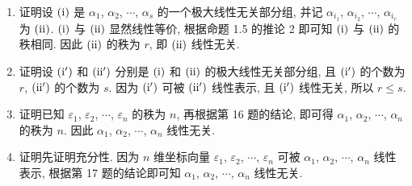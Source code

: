\documentclass[a4paper, 11pt]{ctexart}
\begin{document}
\begin{enumerate}
        \item %
            {\heiti 证明}\quad 设 $(\mathrm{\uppercase\expandafter{\romannumeral1}})$ 是 $\alpha_1$, $\alpha_2$, $\cdots$, $\alpha_s$ 的一个极大线性无关部分组, 并记 $\alpha_{i_1}$, $\alpha_{i_2}$, $\cdots$, $\alpha_{i_r}$ 为 $(\mathrm{\uppercase\expandafter{\romannumeral2}})$.
            $(\mathrm{\uppercase\expandafter{\romannumeral1}})$ 与 $(\mathrm{\uppercase\expandafter{\romannumeral2}})$ 显然线性等价, 根据{\heiti 命题 1.5} 的{\heiti 推论 2} 即可知 $(\mathrm{\uppercase\expandafter{\romannumeral1}})$ 与 $(\mathrm{\uppercase\expandafter{\romannumeral2}})$ 的秩相同.
            因此 $(\mathrm{\uppercase\expandafter{\romannumeral2}})$ 的秩为 $r$, 即 $(\mathrm{\uppercase\expandafter{\romannumeral2}})$ 线性无关.
        \item %
            {\heiti 证明}\quad 设 $(\mathrm{\uppercase\expandafter{\romannumeral1'}})$ 和 $(\mathrm{\uppercase\expandafter{\romannumeral2'}})$ 分别是 $(\mathrm{\uppercase\expandafter{\romannumeral1}})$ 和 $(\mathrm{\uppercase\expandafter{\romannumeral2}})$ 的极大线性无关部分组, 且 $(\mathrm{\uppercase\expandafter{\romannumeral1'}})$ 的个数为 $r$, $(\mathrm{\uppercase\expandafter{\romannumeral2'}})$ 的个数为 $s$.
            因为 $(\mathrm{\uppercase\expandafter{\romannumeral1'}})$ 可被 $(\mathrm{\uppercase\expandafter{\romannumeral2'}})$ 线性表示, 且 $(\mathrm{\uppercase\expandafter{\romannumeral1'}})$ 线性无关, 所以 $r \leqslant s$. 
        \item %
            {\heiti 证明}\quad 已知 $\varepsilon_1$, $\varepsilon_2$, $\cdots$, $\varepsilon_n$ 的秩为 $n$, 再根据{\heiti 第 16 题}的结论, 即可得 $\alpha_1$, $\alpha_2$, $\cdots$, $\alpha_n$ 的秩为 $n$.
            因此 $\alpha_1$, $\alpha_2$, $\cdots$, $\alpha_n$ 线性无关.
        \item %
            {\heiti 证明}\quad 先证明充分性. 因为 $n$ 维坐标向量 $\varepsilon_1$, $\varepsilon_2$, $\cdots$, $\varepsilon_n$ 可被 $\alpha_1$, $\alpha_2$, $\cdots$, $\alpha_n$ 线性表示, 根据{\heiti 第 17 题}的结论即可知 $\alpha_1$, $\alpha_2$, $\cdots$, $\alpha_n$ 线性无关.
            

\end{enumerate}
\end{document}
